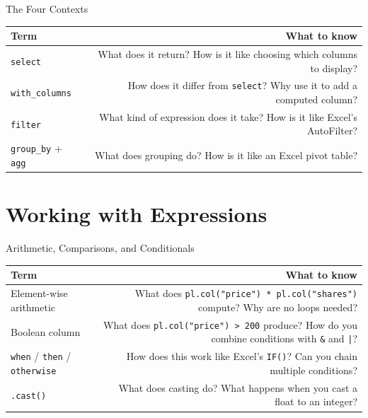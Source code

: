 \documentclass[9pt,aspectratio=169]{beamer}
\begin{document}
\begin{frame}{The Four Contexts}

\begin{tabular}{@{}lR@{}}
\toprule
\textbf{Term} & \textbf{What to know} \\
\midrule
\alert{\texttt{select}} & What does it return? How is it like choosing which columns to display? \\[0.8em]
\alert{\texttt{with\_columns}} & How does it differ from \texttt{select}? Why use it to add a computed column? \\[0.8em]
\alert{\texttt{filter}} & What kind of expression does it take? How is it like Excel's AutoFilter? \\[0.8em]
\alert{\texttt{group\_by} + \texttt{agg}} & What does grouping do? How is it like an Excel pivot table? \\
\bottomrule
\end{tabular}

\end{frame}


\section{Working with Expressions}

\begin{frame}{Arithmetic, Comparisons, and Conditionals}

\begin{tabular}{@{}lR@{}}
\toprule
\textbf{Term} & \textbf{What to know} \\
\midrule
\alert{Element-wise arithmetic} & What does \texttt{pl.col("price") * pl.col("shares")} compute? Why are no loops needed? \\[0.8em]
\alert{Boolean column} & What does \texttt{pl.col("price") > 200} produce? How do you combine conditions with \texttt{\&} and \texttt{|}? \\[0.8em]
\alert{\texttt{when} / \texttt{then} / \texttt{otherwise}} & How does this work like Excel's \texttt{IF()}? Can you chain multiple conditions? \\[0.8em]
\alert{\texttt{.cast()}} & What does casting do? What happens when you cast a float to an integer? \\
\bottomrule
\end{tabular}

\end{frame}
\end{document}
